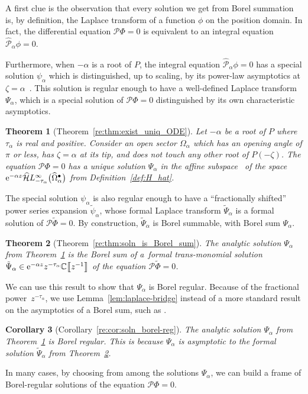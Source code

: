 \documentclass[10pt,a4paper]{amsart}
\newcommand{\dualsingexp}[1]{\widehat{\mathcal{H}}L^\infty_{#1}}
\newcommand{\C}{\mathbb{C}}
\newcommand{\series}[1]{\tilde{#1}}
\newcommand{\laplace}{\mathcal{L}}
\numberwithin{equation}{section}
\newtheorem{Theorem}{Theorem}[section]
\newtheorem{Corollary}[Theorem]{Corollary}
\begin{document}
A first clue is the observation that every solution we get from Borel summation is, by definition, the Laplace transform \smash{$\Phi = \laplace_{\zeta,\alpha}^\theta \phi$} of a function $\phi$ on the position domain. In fact, the differential equation $\mathcal{P}\Phi = 0$ is equivalent to an integral equation $\hat{\mathcal{P}}_\alpha \phi = 0$.

Furthermore, when $-\alpha$ is a root of $P$, the integral equation $\hat{\mathcal{P}}_\alpha \phi = 0$ has a special solution $\psi_\alpha$ which is distinguished, up to scaling, by its power-law asymptotics at $\zeta = \alpha$~\cite[Theorem~4.6]{reg-sing-volterra}. This solution is regular enough to have a well-defined Laplace transform $\Psi_\alpha$, which is a special solution of $\mathcal{P}\Phi = 0$ distinguished by its own characteristic asymptotics.
\begin{Theorem}[Theorem~\ref{re:thm:exist_uniq_ODE}]\label{thm:exist_uniq_ODE}
Let $-\alpha$ be a root of $P$ where $\tau_\alpha$ is real and positive. Consider an open sector $\Omega_\alpha$ which has an opening angle of $\pi$ or less, has $\zeta = \alpha$ at its tip, and does not touch any other root of $P(-\zeta)$. The equation $\mathcal{P}\Phi = 0$ has a unique solution $\Psi_\alpha$ in the affine subspace~\smash{${\rm e}^{-\alpha z} \bigl[ z^{-\tau_\alpha} + \dualsingexp{-\tau_\alpha-1}\bigl(\widehat{\Omega}_\alpha^\bullet\bigr) \bigr] $}
of the space ${\rm e}^{-\alpha z} \dualsingexp{-\tau_\alpha}\bigl(\widehat{\Omega}_\alpha^\bullet\bigr)$ from Definition~{\rm\ref{def:H_hat}}.
\end{Theorem}
The special solution $\psi_\alpha$ is also regular enough to have a ``fractionally shifted'' power series expansion $\series{\psi}_\alpha$, whose formal Laplace transform $\series{\Psi}_\alpha$ is a formal solution of $\mathcal{P}\series{\Phi} = 0$. By construction, $\series{\Psi}_\alpha$ is Borel summable, with Borel sum $\Psi_\alpha$.
\begin{Theorem}[Theorem~\ref{re:thm:soln_is_Borel_sum}]\label{thm:soln_is_Borel_sum}
The analytic solution $\Psi_\alpha$ from Theorem~{\rm\ref{thm:exist_uniq_ODE}} is the Borel sum of a~formal trans-monomial solution $\series{\Psi}_\alpha \in {\rm e}^{-\alpha z} z^{-\tau_\alpha} \C \big\llbracket z^{-1} \big\rrbracket$ of the equation $\mathcal{P}\series{\Phi} = 0$.
\end{Theorem}

We can use this result to show that $\Psi_\alpha$ is Borel regular. Because of the fractional power~$z^{-\tau_\alpha}$, we use Lemma~\ref{lem:laplace-bridge} instead of a more standard result on the asymptotics of a Borel sum, such as \cite[Theorem~5.20]{diverg-resurg-i}.
\begin{Corollary}[Corollary~\ref{re:cor:soln_borel-reg}]\label{cor:soln_borel-reg}
The analytic solution $\Psi_\alpha$ from Theorem~{\rm\ref{thm:exist_uniq_ODE}} is Borel regular. This is because $\Psi_\alpha$ is asymptotic to the formal solution $\series{\Psi}_\alpha$ from Theorem~{\rm\ref{thm:soln_is_Borel_sum}}.
\end{Corollary}
In many cases, by choosing from among the solutions $\Psi_\alpha$, we can build a frame of Borel-regular solutions of the equation $\mathcal{P}\Phi = 0$.
\end{document}
